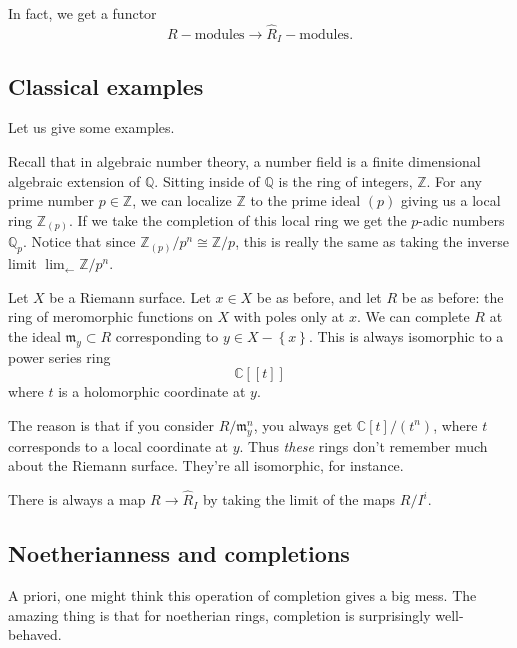 In fact, we get a functor 
\[ R-\mathrm{modules} \to \hat{R}_I - \mathrm{modules}.  \]


\subsection{Classical examples}
Let us give some examples.
\begin{example}
Recall that in algebraic number theory, a number field is a 
finite dimensional algebraic extension of $\mathbb{Q}$. 
Sitting inside of $\mathbb{Q}$ is the ring of integers, $\mathbb{Z}$. For any prime number $p\in \mathbb{Z}$, we can localize $\mathbb{Z}$ to the 
 prime ideal $(p)$ giving us a local ring $\mathbb{Z}_(p)$. 
 If we take the completion of this local ring we get the $p$-adic numbers $\mathbb{Q}_p$. Notice that since $\mathbb{Z}_(p)/p^n\cong\mathbb{Z}/p$, this is really the same as taking the inverse limit $\lim_{\leftarrow}\mathbb{Z}/p^n$.
\end{example}

\begin{example} 
Let $X$ be a Riemann surface. Let $ x \in X$ be as before, and let $R$ be as
before: the ring of meromorphic functions on $X$ with poles only at $x$. We can
complete $R$ at the ideal $\mathfrak{m}_y \subset R$ corresponding to $y \in X - \left\{x\right\}$. This
is always isomorphic to a power series ring
\[ \mathbb{C}[[t]]  \]
where $t$ is a holomorphic coordinate at $y$. 

The reason is that if you consider $R/\mathfrak{m}_y^n$, you always get
$\mathbb{C}[t]/(t^n)$, where $t$ corresponds to a local coordinate at $y$. Thus
\emph{these} rings don't remember much about the Riemann surface. They're all
isomorphic, for instance. 
\end{example} 

\begin{remark} 
There is always a map $R \to \hat{R}_I$ by taking the limit of the maps $R/I^i$.
\end{remark} 

\subsection{Noetherianness and completions}

A priori, one might think this operation of completion gives  a big mess. The amazing thing is that for
noetherian rings, completion is surprisingly well-behaved.



